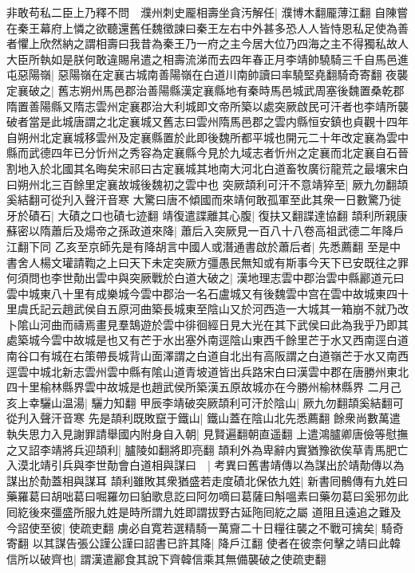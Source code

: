 非敢苟私二臣上乃釋不問　濮州刺史龎相壽坐貪汚解任|{
	濮博木翻龎薄江翻}
自陳嘗在秦王幕府上憐之欲聽還舊任魏徵諫曰秦王左右中外甚多恐人人皆恃恩私足使為善者懼上欣然納之謂相壽曰我昔為秦王乃一府之主今居大位乃四海之主不得獨私故人大臣所執如是朕何敢違賜帛遣之相壽流涕而去四年春正月李靖帥驍騎三千自馬邑進屯惡陽嶺|{
	惡陽嶺在定襄古城南善陽嶺在白道川南帥讀曰率驍堅堯翻騎奇寄翻}
夜襲定襄破之|{
	舊志朔州馬邑郡治善陽縣漢定襄縣地有秦時馬邑城武周塞後魏置桑乾郡隋置善陽縣又隋志雲州定襄郡治大利城即文帝所築以處突厥啟民可汗者也李靖所襲破者當是此城唐謂之北定襄城又舊志曰雲州隋馬邑郡之雲内縣恒安鎮也貞觀十四年自朔州北定襄城移雲州及定襄縣置於此即後魏所都平城也開元二十年改定襄為雲中縣而武德四年已分忻州之秀容為定襄縣今見於九域志者忻州之定襄而北定襄自石晉割地入於北國其名晦矣宋祁曰古定襄城其地南大河北白道畜牧廣衍龍荒之最壤宋白曰朔州北三百餘里定襄故城後魏初之雲中也}
突厥頡利可汗不意靖猝至|{
	厥九勿翻頡奚結翻可從刋入聲汗音寒}
大驚曰唐不傾國而來靖何敢孤軍至此其衆一日數驚乃徙牙於磧石|{
	大磧之口也磧七迹翻}
靖復遣諜離其心腹|{
	復扶又翻諜達協翻}
頡利所親康蘇密以隋蕭后及煬帝之孫政道來降|{
	蕭后入突厥見一百八十八卷高祖武德二年降戶江翻下同}
乙亥至京師先是有降胡言中國人或潛通書啟於蕭后者|{
	先悉薦翻}
至是中書舍人楊文瓘請鞫之上曰天下未定突厥方彊愚民無知或有斯事今天下已安既往之罪何須問也李世勣出雲中與突厥戰於白道大破之|{
	漢地理志雲中郡治雲中縣酈道元曰雲中城東八十里有成樂城今雲中郡治一名石盧城又有後魏雲中宫在雲中故城東四十里虞氏記云趙武侯自五原河曲築長城東至陰山又於河西造一大城其一箱崩不就乃改卜隂山河曲而禱焉畫見羣鵠遊於雲中徘徊經日見大光在其下武侯曰此為我乎乃即其處築城今雲中故城是也又有芒于水出塞外南逕陰山東西千餘里芒于水又西南逕白道南谷口有城在右策帶長城背山面澤謂之白道自北出有高阪謂之白道嶺芒于水又南西逕雲中城北新志雲州雲中縣有隂山道青坡道皆出兵路宋白曰漢雲中郡在唐勝州東北四十里榆林縣界雲中故城是也趙武侯所築漢五原故城亦在今勝州榆林縣界}
二月己亥上幸驪山温湯|{
	驪力知翻}
甲辰李靖破突厥頡利可汗於陰山|{
	厥九勿翻頡奚結翻可從刋入聲汗音寒}
先是頡利既敗竄于鐵山|{
	鐵山蓋在陰山北先悉薦翻}
餘衆尚數萬遣執失思力入見謝罪請舉國内附身自入朝|{
	見賢遍翻朝直遥翻}
上遣鴻臚卿唐儉等慰撫之又詔李靖將兵迎頡利|{
	臚陵如翻將即亮翻}
頡利外為卑辭内實猶豫欲俟草青馬肥亡入漠北靖引兵與李世勣會白道相與謀曰　|{
	考異曰舊書靖傳以為謀出於靖勣傳以為謀出於勣蓋相與謀耳}
頡利雖敗其衆猶盛若走度磧北保依九姓|{
	新書囘鶻傳有九姓曰藥羅葛曰胡咄葛曰啒羅勿曰貃歌息訖曰阿勿嘀曰葛薩曰斛嗢素曰藥勿葛曰奚邪勿此囘紇後來彊盛所服九姓是時所謂九姓即謂拔野古延陁囘紇之屬}
道阻且遠追之難及今詔使至彼|{
	使疏吏翻}
虜必自寛若選精騎一萬齎二十日糧往襲之不戰可擒矣|{
	騎奇寄翻}
以其謀告張公謹公謹曰詔書已許其降|{
	降戶江翻}
使者在彼柰何擊之靖曰此韓信所以破齊也|{
	謂漢遣酈食其說下齊韓信乘其無備襲破之使疏吏翻}
